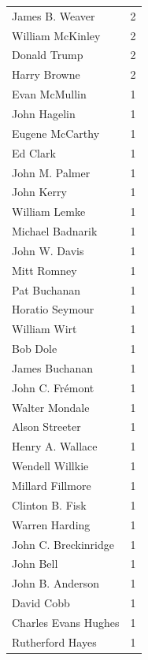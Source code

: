 \documentclass[
  letterpaper,
  DIV=11,
  numbers=noendperiod]{scrreprt}
\begin{document}
\begin{tabular}{lr}
James B. Weaver        &          2 \\
William McKinley       &          2 \\
Donald Trump           &          2 \\
Harry Browne           &          2 \\
Evan McMullin          &          1 \\
John Hagelin           &          1 \\
Eugene McCarthy        &          1 \\
Ed Clark               &          1 \\
John M. Palmer         &          1 \\
John Kerry             &          1 \\
William Lemke          &          1 \\
Michael Badnarik       &          1 \\
John W. Davis          &          1 \\
Mitt Romney            &          1 \\
Pat Buchanan           &          1 \\
Horatio Seymour        &          1 \\
William Wirt           &          1 \\
Bob Dole               &          1 \\
James Buchanan         &          1 \\
John C. Frémont        &          1 \\
Walter Mondale         &          1 \\
Alson Streeter         &          1 \\
Henry A. Wallace       &          1 \\
Wendell Willkie        &          1 \\
Millard Fillmore       &          1 \\
Clinton B. Fisk        &          1 \\
Warren Harding         &          1 \\
John C. Breckinridge   &          1 \\
John Bell              &          1 \\
John B. Anderson       &          1 \\
David Cobb             &          1 \\
Charles Evans Hughes   &          1 \\
Rutherford Hayes       &          1 \\

\end{tabular}
\end{document}
